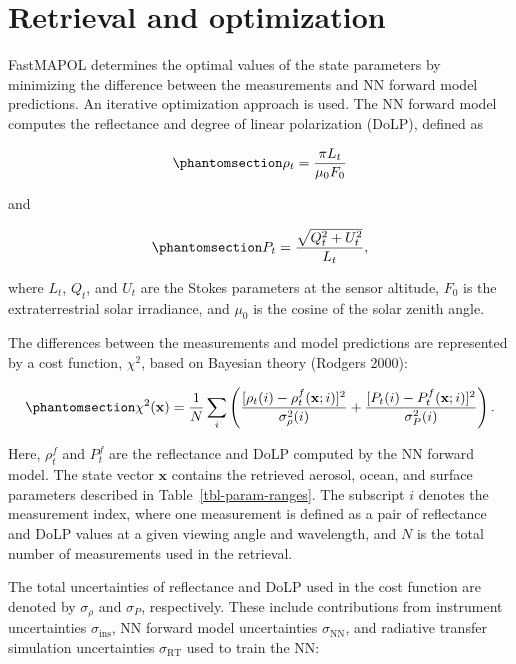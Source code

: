 \documentclass[
  11pt,
  letterpaper,
  DIV=11,
  numbers=noendperiod]{scrreprt}
\begin{document}
\section{Retrieval and optimization}\label{retrieval-and-optimization}

FastMAPOL determines the optimal values of the state parameters by
minimizing the difference between the measurements and NN forward model
predictions. An iterative optimization approach is used. The NN forward
model computes the reflectance and degree of linear polarization (DoLP),
defined as

\begin{equation}\phantomsection\label{eq-rho}{
\rho_t
=
\frac{\pi L_t}{\mu_0 F_0}
}\end{equation}

and

\begin{equation}\phantomsection\label{eq-DoLP}{
P_t
=
\frac{\sqrt{Q_t^2+U_t^2}}{L_t},
}\end{equation}

where \(L_t\), \(Q_t\), and \(U_t\) are the Stokes parameters at the
sensor altitude, \(F_0\) is the extraterrestrial solar irradiance, and
\(\mu_0\) is the cosine of the solar zenith angle.

The differences between the measurements and model predictions are
represented by a cost function, \(\chi^2\), based on Bayesian theory
(Rodgers 2000):

\begin{equation}\phantomsection\label{eq-cost}{
\chi^2({\mathbf x})
=
\frac{1}{N}
\sum_i
\left(
\frac{[\rho_t(i)-\rho_t^f({\mathbf x};i)]^2}{\sigma_\rho^2(i)}
+
\frac{[P_t(i)-P_t^f({\mathbf x};i)]^2}{\sigma_P^2(i)}
\right).
}\end{equation}

Here, \(\rho_t^f\) and \(P_t^f\) are the reflectance and DoLP computed
by the NN forward model. The state vector \({\mathbf x}\) contains the
retrieved aerosol, ocean, and surface parameters described in
Table~\ref{tbl-param-ranges}. The subscript \(i\) denotes the
measurement index, where one measurement is defined as a pair of
reflectance and DoLP values at a given viewing angle and wavelength, and
\(N\) is the total number of measurements used in the retrieval.

The total uncertainties of reflectance and DoLP used in the cost
function are denoted by \(\sigma_\rho\) and \(\sigma_P\), respectively.
These include contributions from instrument uncertainties
\(\sigma_{\mathrm{ins}}\), NN forward model uncertainties
\(\sigma_{\mathrm{NN}}\), and radiative transfer simulation
uncertainties \(\sigma_{\mathrm{RT}}\) used to train the NN:
\end{document}
